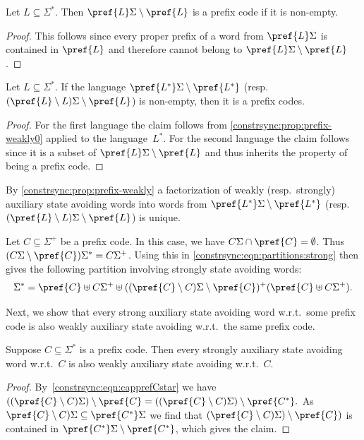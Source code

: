 \begin{proposition} \label{constrsync:prop:prefix-weakly0} 
	Let $L \subseteq \Sigma^*$.
	Then $\pref{L}\Sigma \setminus \pref{L}$
	is a prefix code if it is non-empty.
\end{proposition}
\begin{proof}
	This follows since every proper prefix of a word from $\pref{L}\Sigma$
	is contained in $\pref{L}$
	and therefore cannot belong to $\pref{L}\Sigma \setminus \pref{L}$.
\end{proof}
	
\begin{corollary}\label{constrsync:prop:prefix-weakly} 
	Let $L \subseteq \Sigma^*$.
	If the language $\pref{L^*}\Sigma \setminus \pref{L^*}$ (resp.~$(\pref{L} \setminus L)\Sigma \setminus \pref{L}$) is non-empty,
	then it is a prefix codes.
\end{corollary}
\begin{proof} 
	For the first language the claim
	follows from \cref{constrsync:prop:prefix-weakly0} 
	applied to the language~$L^*$.
	For the second language
	the claim follows since it is a subset
	of $\pref{L}\Sigma \setminus \pref{L}$
	and thus inherits the property of being a prefix code.
\end{proof}

By \cref{constrsync:prop:prefix-weakly} a factorization
of weakly (resp.~strongly) auxiliary state avoiding
words into words from $\pref{L^*}\Sigma \setminus \pref{L^*}$ 
(resp.~$( \pref{L} \setminus L )\Sigma \setminus \pref{L}$) is unique.

Let $C \subseteq \Sigma^+$ be a prefix code.
In this case, we have $C\Sigma \cap \pref{C} = \emptyset$.
Thus $(C\Sigma \setminus \pref{C}) \Sigma^* = C \Sigma^+$.
Using this in \cref{constrsync:eqn:partitions:strong} then gives
the following partition involving strongly state avoiding words:
\begin{equation} \label{constrsync:eqn:partitions:strong2}
	\Sigma^* = \pref{C} \uplus C\Sigma^+ \uplus ( ( \pref{C} \setminus C )\Sigma \setminus \pref{C})^+ ( \pref{C} \uplus C\Sigma^+ ).
\end{equation}

Next, we show that every strong auxiliary state avoiding word
w.r.t.~some prefix code is also weakly auxiliary state avoiding w.r.t.~the same prefix code.

\begin{proposition}
\label{constrsync:prop:prefix-weakly-implies-strongly} 
Suppose $C \subseteq \Sigma^*$ is a prefix code. 
Then every strongly auxiliary state avoiding
word w.r.t.~$C$ is also weakly auxiliary state avoiding w.r.t.~$C$.
\end{proposition}
\begin{proof}
By~\cref{constrsync:eqn:capprefCstar} we have
$
 ( ( \pref{C} \setminus C)\Sigma ) \setminus \pref{C} 
 = ( ( \pref{C} \setminus C)\Sigma ) \setminus \pref{C^*}. 
$
As $\pref{C} \setminus C)\Sigma \subseteq \pref{C^*}\Sigma$
we find that $(\pref{C} \setminus C)\Sigma) \setminus \pref{C} )$
is contained in $\pref{C^*} \Sigma \setminus \pref{C^*}$,
which gives the claim.
\end{proof}

